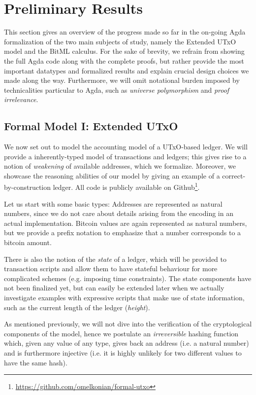 \documentclass[acmsmall,nonacm=true,screen=true]{acmart}
\newcommand\site[1]{\footnote{\url{#1}}}
\begin{document}
\section{Preliminary Results}
\label{sec:results}
This section gives an overview of the progress made so far in the on-going Agda formalization of the two main subjects of study,
namely the Extended UTxO model and the BitML calculus.
For the sake of brevity, we refrain from showing the full Agda code along with the complete proofs, but rather
provide the most important datatypes and formalized results and explain crucial design choices we made along the way.
Furthermore, we will omit notational burden imposed by technicalities particular to Agda, such as \textit{universe polymorphism}
and \textit{proof irrelevance}.

\subsection{Formal Model I: Extended UTxO} \label{subsec:eutxo}
We now set out to model the accounting model of a UTxO-based ledger.
We will provide a inherently-typed model of transactions and ledgers;
this gives rise to a notion of \textit{weakening} of available addresses, which we formalize.
Moreover, we showcase the reasoning abilities of our model by giving
an example of a correct-by-construction ledger.
All code is publicly available on Github\site{https://github.com/omelkonian/formal-utxo}.

Let us start with some basic types:
\UTXObasicTypes{}
Addresses are represented as natural numbers, since we do not care about details arising from the encoding in an
actual implementation. Bitcoin values are again represented as natural numbers, but we provide a prefix notation
to emphasize that a number corresponds to a bitcoin amount.

There is also the notion of the \textit{state} of a ledger, which will be provided to transaction scripts and allow
them to have stateful behaviour for more complicated schemes (e.g. imposing time constraints).
\UTXOstate{}
The state components have not been finalized yet, but can easily be extended later when we actually investigate
examples with expressive scripts that make use of state information, such as the current length of the ledger (\textit{height}).

As mentioned previously, we will not dive into the verification of the cryptological components of the model,
hence we postulate an \textit{irreversible} hashing function which, given any value of any type,
gives back an address (i.e. a natural number) and is furthermore injective (i.e. it is highly unlikely for two different
values to have the same hash).
\UTXOhash{}
\end{document}
